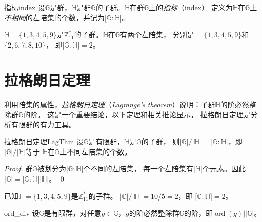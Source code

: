  \begin{definition}{指标}{index}
 	   设$\mathbb{G}$是群，$\mathbb{H}$是群$\mathbb{G}$的子群。$\mathbb{H}$在群$\mathbb{G}$上的\emph{指标}（index）
 	   定义为$\mathbb{H}$在$\mathbb{G}$上\emph{不相同}的左陪集的个数，并记为$\lbrack \mathbb{G}: \mathbb{H} \rbrack$。
 \end{definition}
     
 \begin{example}
      $\mathbb{H} = \{ 1, 3, 4, 5, 9 \}$是$\mathbb{Z}_{11}^*$的子群。$\mathbb{H}$在$\mathbb{G}$有两个左陪集，
      分别是$ = \{ 1, 3, 4, 5, 9 \}$和$ \{ 2, 6, 7, 8, 10 \}$，
      即$\lbrack \mathbb{G}: \mathbb{H} \rbrack = 2$。
\end{example}

\section{拉格朗日定理} 	
 利用陪集的属性，\emph{拉格朗日定理}（\emph{Lagrange's theorem}）说明：子群$\mathbb{H}$的阶必然整除群$\mathbb{G}$的阶。
 这是一个重要结论，以下定理和相关推论显示，
 拉格朗日定理是分析有限群的有力工具。
 	\begin{theorem}{拉格朗日定理}{LagThm}
 	设$\mathbb{G}$是有限群，$\mathbb{H}$是$\mathbb{G}$的子群，
 	则$\vert \mathbb{G} \vert / \vert \mathbb{H} \vert = \lbrack \mathbb{G} : \mathbb{H}\rbrack$，即
 	$\vert \mathbb{G} \vert / \vert \mathbb{H} \vert$等于
 	$\mathbb{H}$在$\mathbb{G}$上不同左陪集的个数。 
 	\end{theorem}
 
 \begin{proof}
 群$\mathbb{G}$被划分为$\lbrack \mathbb{G} : \mathbb{H}\rbrack$个不同的左陪集，
 每一个左陪集有$\vert \mathbb{H} \vert$个元素。因此$\vert \mathbb{G} \vert  = \lbrack \mathbb{G} : \mathbb{H}\rbrack \vert  \mathbb{H} \vert$。 \qed
 \end{proof}
 
  \begin{example}
       已知$\mathbb{H} = \{ 1, 3, 4, 5, 9 \}$是$\mathbb{Z}_{11}^*$的子群。
       $\vert \mathbb{G} \vert / \vert \mathbb{H} \vert = 10 / 5 = 2$，即 $ \lbrack \mathbb{G} : \mathbb{H}\rbrack = 2$。
 \end{example}
 
 \begin{corollary}{}{ord_div}
 	设$\mathbb{G}$是有限群，对任意$g \in \mathbb{G}$，$g$的阶必然整除群$\mathbb{G}$的阶，即$\operatorname{ord}(g)\mid \vert \mathbb{G} \vert$。
 \end{corollary}
 	
